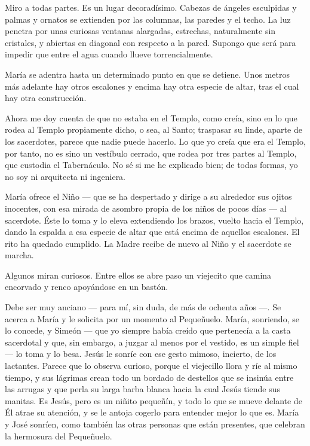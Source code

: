\documentclass[12pt]{book} %
\begin{document}
Miro a todas partes. Es un lugar decoradísimo. Cabezas de ángeles esculpidas y palmas y ornatos se extienden por las columnas, las paredes y el techo. La luz penetra por unas curiosas ventanas alargadas, estrechas, naturalmente sin cristales, y abiertas en diagonal con respecto a la pared. Supongo que será para impedir que entre el agua cuando llueve torrencialmente. 

María se adentra hasta un determinado punto en que se detiene. Unos metros más adelante hay otros escalones y encima hay otra especie de altar, tras el cual hay otra construcción. 

Ahora me doy cuenta de que no estaba en el Templo, como creía, sino en lo que rodea al Templo propiamente dicho, o sea, al Santo; traspasar su linde, aparte de los sacerdotes, parece que nadie puede hacerlo. Lo que yo creía que era el Templo, por tanto, no es sino un vestíbulo cerrado, que rodea por tres partes al Templo, que custodia el Tabernáculo. No sé si me he explicado bien; de todas formas, yo no soy ni arquitecta ni ingeniera. 

María ofrece el Niño — que se ha despertado y dirige a su alrededor sus ojitos inocentes, con esa mirada de asombro propia de los niños de pocos días — al sacerdote. Éste lo toma y lo eleva extendiendo los brazos, vuelto hacia el Templo, dando la espalda a esa especie de altar que está encima de aquellos escalones. El rito ha quedado cumplido. La Madre recibe de nuevo al Niño y el sacerdote se marcha. 

Algunos miran curiosos. Entre ellos se abre paso un viejecito que camina encorvado y renco apoyándose en un bastón. 

Debe ser muy anciano — para mí, sin duda, de más de ochenta años —. Se acerca a María y le solicita por un momento al Pequeñuelo. María, sonriendo, se lo concede, y Simeón — que yo siempre había creído que pertenecía a la casta sacerdotal y que, sin embargo, a juzgar al menos por el vestido, es un simple fiel — lo toma y lo besa. Jesús le sonríe con ese gesto mimoso, incierto, de los lactantes. Parece que lo observa curioso, porque el viejecillo llora y ríe al mismo tiempo, y sus lágrimas crean todo un bordado de destellos que se insinúa entre las arrugas y que perla su larga barba blanca hacia la cual Jesús tiende sus manitas. Es Jesús, pero es un niñito pequeñín, y todo lo que se mueve delante de Él atrae su atención, y se le antoja cogerlo para entender mejor lo que es. María y José sonríen, como también las otras personas que están presentes, que celebran la hermosura del Pequeñuelo. 
\end{document}
